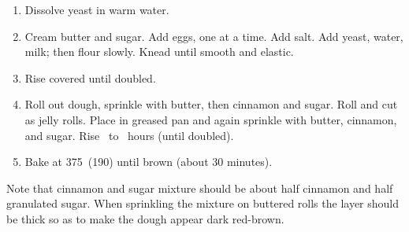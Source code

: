 
\begin{ingredients}
\end{ingredients}


\begin{recipe}
  \begin{enumerate}
  \item Dissolve yeast in warm water.

  \item Cream butter and sugar.  Add eggs, one at a time.  Add salt.
  Add yeast, water, milk; then flour slowly.  Knead until smooth and
  elastic.

\item Rise covered until doubled.

\item Roll out dough, sprinkle with butter, then cinnamon and sugar.
  Roll and cut as jelly rolls. Place in greased pan and again sprinkle
  with butter, cinnamon, and sugar.  Rise \fracH\ to \fracQQ\ hours
  (until doubled).

\item Bake at 375\F\ (190\degreeC) until brown (about 30 minutes).

  \end{enumerate}

  Note that cinnamon and sugar mixture should be about half cinnamon
  and half granulated sugar.  When sprinkling the mixture on buttered
  rolls the layer should be thick so as to make the dough appear dark
  red-brown.
\end{recipe}
